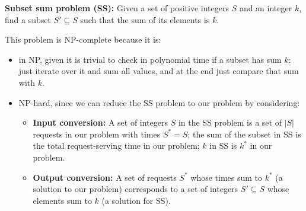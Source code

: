 \documentclass{cal}
\begin{document}
{\textbf{Subset sum problem (SS): } Given a set of positive integers $S$ and an integer $k$, find a subset $S' \subseteq S$ such that the sum of its elements is $k$.

\ansseparator

This problem is NP-complete because it is:
\begin{itemize}
    \item in NP, given it is trivial to check in polynomial time if a subset has sum $k$: just iterate over it and sum all values, and at the end just compare that sum with $k$.
    \item NP-hard, since we can reduce the SS problem to our problem by considering:
    \begin{itemize}
        \item \textbf{Input conversion:} A set of integers $S$ in the SS problem is a set of $|S|$ requests in our problem with times $S^* = S$; the sum of the subset in SS is the total request-serving time in our problem; $k$ in SS is $k^*$ in our problem.
        \item \textbf{Output conversion:} A set of requests $S^*$ whose times sum to $k^*$ (a solution to our problem) corresponds to a set of integers $S' \subseteq S$ whose elements sum to $k$ (a solution for SS).
    \end{itemize}
\end{itemize}

}
\end{document}
